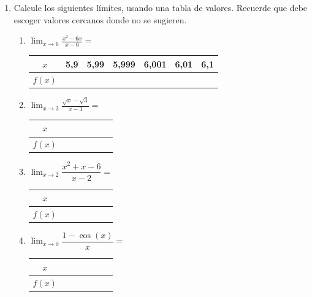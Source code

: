 \documentclass[fleqn,10pt]{article}
\let\ds\displaystyle
\begin{document}
\ExamNameLine
\begin{enumerate}
   \item Calcule los siguientes límites, usando una tabla de valores. Recuerde que debe escoger valores cercanos donde no se sugieren.
      \begin{enumerate}
	 \item $\ds{\lim_{x\rightarrow6}\frac{x^{2}-6x}{x-6}}=$
\begin{center}
   \begin{tabular}{|c|p{1.5cm}|p{1.5cm}|p{1.5cm}||p{1.5cm}|p{1.5cm}|p{1.5cm}|}
\hline 
$x$ & 5,9 & 5,99 & 5,999 & 6,001 & 6,01 & 6,1  \\ 
\hline 
$f(x)$ &  &  &  &  & & \\ 
\hline 
\end{tabular} 
\end{center}	 
	 \item $\ds{\lim_{x\rightarrow3}\frac{\sqrt{x}-\sqrt{3}}{x-3}}=$
\begin{center}
   \begin{tabular}{|c|p{1.5cm}|p{1.5cm}|p{1.5cm}||p{1.5cm}|p{1.5cm}|p{1.5cm}|}
\hline 
$x$ &  &  &  &  &  &  \\ 
\hline 
$f(x)$ &  &  &  &  & & \\ 
\hline 
\end{tabular} 
\end{center}	
\item $\ds{\lim_{x\rightarrow 2}\dfrac{x^2+x-6}{x-2}}=$	 
\begin{center}
   \begin{tabular}{|c|p{1.5cm}|p{1.5cm}|p{1.5cm}||p{1.5cm}|p{1.5cm}|p{1.5cm}|}
\hline 
$x$ &  &  &  &  &  &  \\ 
\hline 
$f(x)$ &  &  &  &  & & \\ 
\hline 
\end{tabular} 
\end{center}	
\item $\ds{\lim_{x\rightarrow 0}\dfrac{1-\cos(x)}{x}}=$
\begin{center}
   \begin{tabular}{|c|p{1.5cm}|p{1.5cm}|p{1.5cm}||p{1.5cm}|p{1.5cm}|p{1.5cm}|}
\hline 
$x$ &  &  &  &  &  &  \\ 
\hline 
$f(x)$ &  &  &  &  & & \\ 

\end{tabular}
\end{center}
\end{enumerate}
\end{enumerate}
\end{document}
